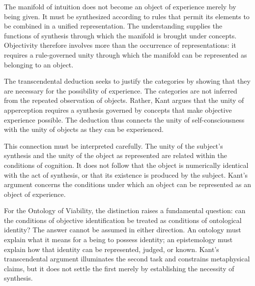 The manifold of intuition does not become an
object of experience merely by being given.
It must be synthesized according to rules that
permit its elements to be combined in a unified
representation. The understanding supplies the
functions of synthesis through which the manifold
is brought under concepts. Objectivity therefore
involves more than the occurrence of representations:
it requires a rule-governed unity through which
the manifold can be represented as belonging
to an object.
\cite[B137--B143]{KantCritiquePureReason}

\label{para:VS.B01.P01.C08.S10.SS06.P002}

The transcendental deduction seeks to justify
the categories by showing that they are necessary
for the possibility of experience. The categories
are not inferred from the repeated observation
of objects. Rather, Kant argues that the unity
of apperception requires a synthesis governed
by concepts that make objective experience possible.
The deduction thus connects the unity of
self-consciousness with the unity of objects
as they can be experienced.

\label{para:VS.B01.P01.C08.S10.SS06.P003}

This connection must be interpreted carefully.
The unity of the subject's synthesis and the unity
of the object as represented are related within
the conditions of cognition. It does not follow
that the object is numerically identical with
the act of synthesis, or that its existence is
produced by the subject. Kant's argument concerns
the conditions under which an object can be
represented as an object of experience.

\label{para:VS.B01.P01.C08.S10.SS06.P004}

For the Ontology of Viability, the distinction
raises a fundamental question: can the conditions
of objective identification be treated as
conditions of ontological identity? The answer
cannot be assumed in either direction. An
ontology must explain what it means for a being
to possess identity; an epistemology must explain
how that identity can be represented, judged,
or known. Kant's transcendental argument
illuminates the second task and constrains
metaphysical claims, but it does not settle
the first merely by establishing the necessity
of synthesis.

\label{para:VS.B01.P01.C08.S10.SS06.P005}

